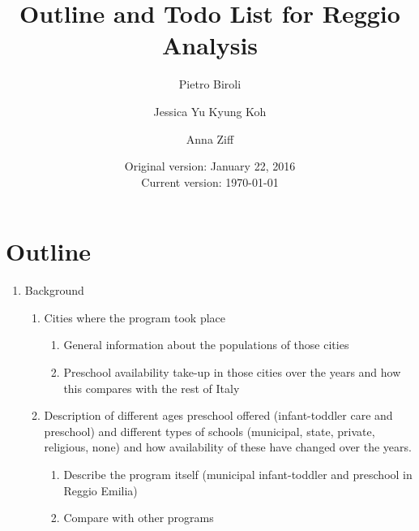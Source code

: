 \documentclass{article}
\begin{document}
\title{Outline and Todo List for Reggio Analysis}
\author{Pietro Biroli \and Jessica Yu Kyung Koh \and Anna Ziff}
\date{Original version: January 22, 2016 \\ Current version: \today}
\maketitle

\listoftodos

\section{Outline}
\begin{enumerate}

\item Background 
\begin{enumerate}
	\item Cities where the program took place
		\begin{enumerate}
			\item General information about the populations of those cities
			\item Preschool availability take-up in those cities over the years and how this compares with the rest of Italy
		\end{enumerate}
		
	\item Description of different ages preschool offered (infant-toddler care and preschool) and different types of schools (municipal, state, private, religious, none) and how availability of these have changed over the years.
		\begin{enumerate}
			\item Describe the program itself (municipal infant-toddler and preschool in Reggio Emilia) 
			\item Compare with other programs 
		\end{enumerate}
		\end{enumerate}
	

\end{enumerate}
\end{document}
